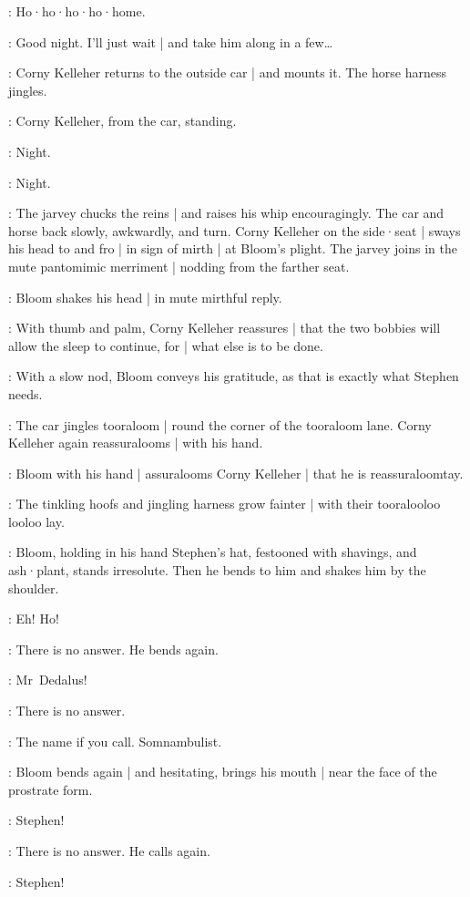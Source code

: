 \Horse:
Ho·ho·ho·ho·home.

\Bloom:
Good night.
I'll just wait |
and take him along in a few…

:
Corny Kelleher returns to the outside car |
and mounts it.
The horse harness jingles.

:
Corny Kelleher,
from the car,
standing.

\Corny:
Night.

\Bloom:
Night.

:
The jarvey chucks the reins |
and raises his whip encouragingly.
The car and horse back slowly,
awkwardly,
and turn.
Corny Kelleher on the side·seat |
sways his head to and fro |
%
in sign of mirth |
at Bloom's plight.
The jarvey joins in the mute pantomimic merriment |
nodding from the farther seat.

:
Bloom shakes his head |
in mute mirthful reply.

:
With thumb and palm,
Corny Kelleher reassures |
that the two bobbies will allow the sleep to continue,
for |
what else is to be done.

:
With a slow nod,
Bloom conveys his gratitude,
as that is exactly what Stephen needs.

:
The car jingles tooraloom |
round the corner of the tooraloom lane.
Corny Kelleher again reassuralooms |
with his hand.

:
Bloom with his hand |
assuralooms Corny Kelleher |
that he is reassuraloomtay.

:
The tinkling hoofs and jingling harness grow fainter |
with their tooralooloo looloo lay.

:
Bloom,
holding in his hand Stephen's hat,
festooned with shavings,
and ash·plant,
stands irresolute.
Then he bends to him and shakes him by the shoulder.

\Bloom:
Eh! Ho!

:
There is no answer. He bends again.

\Bloom:
Mr~Dedalus!

:
There is no answer.

\Bloom:
The name if you call.
Somnambulist.

:
Bloom bends again |
and hesitating,
brings his mouth |
near the face of the prostrate form.

\Bloom:
Stephen!

:
There is no answer.
He calls again.

\Bloom:
Stephen!

